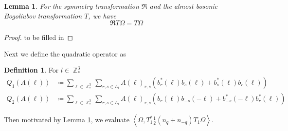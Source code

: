 \documentclass[sn-mathphys,Numbered, a4paper ,nocrop]{sn-jnl}%
\DeclareMathOperator{\Z}{\mathbb{Z}}
\newcommand{\half}{\frac{1}{2}}
\newcommand{\eva}[1]{\left\langle #1 \right\rangle}
\theoremstyle{plain}
\newtheorem{lemma}[theorem]{Lemma}
\theoremstyle{definition}
\newtheorem{definition}[theorem]{Definition}
\theoremstyle{remark}
\theoremstyle{plain}
\theoremstyle{definition}
\theoremstyle{remark}
\begin{document}
\begin{lemma}\label{lem:symtransformation}
    For the symmetry transformation $\mathfrak{R}$ and the almost bosonic Bogoliubov transformation $T$, we have
    \begin{equation}
        \mathfrak{R}T\Omega = T\Omega
    \end{equation}
\end{lemma}
\begin{proof}
    to be filled in
\end{proof}
Next we define the quadratic operator as 
\begin{definition}
For $l \in \Z^3_*$
\begin{align} 
    Q_1(A(\ell))&\coloneq  \sum\limits_{\ell \in \Z^3_*}\sum\limits_{r,s \in L_{l}}A(\ell)_{r,s} \left(b^*_r(\ell)b_{s}(\ell)+b^*_{s}(\ell)b_{r}(\ell)\right)\label{eq:Q1}\\ 
    Q_2(A(\ell))&\coloneq  \sum\limits_{\ell \in \Z^3_*}\sum\limits_{r,s \in L_{l}}A(\ell)_{r,s} \left(b_r(\ell)b_{-s}(-\ell)+b^*_{-s}(-\ell)b^*_{r}(\ell)\right)\label{eq:Q2}
\end{align}
    
\end{definition}

Then motivated by Lemma \ref{lem:symtransformation}, we evaluate $\eva{\Omega, T_1^*\half\left(n_q+n_{-q}\right)T_1\Omega}$.\newline 
\end{document}
